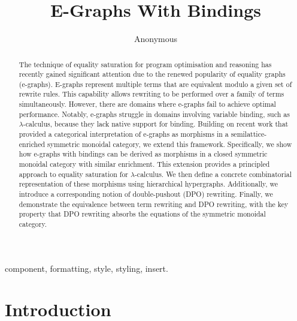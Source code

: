 \documentclass[]{IEEEtran}
\begin{document}
\title{E-Graphs With Bindings
}


\author{Anonymous}

\maketitle

\begin{abstract}
    The technique of equality saturation for program optimisation and reasoning has recently gained significant attention due to the renewed popularity of equality graphs (e-graphs).
    E-graphs represent multiple terms that are equivalent modulo a given set of rewrite rules. 
    This capability allows rewriting to be performed over a family of terms simultaneously.    
    However, there are domains where e-graphs fail to achieve optimal performance. 
	Notably, e-graphs struggle in domains involving variable binding, such as $\lambda$-calculus, because they lack native support for binding.
    Building on recent work that provided a categorical interpretation of e-graphs as morphisms in a semilattice-enriched symmetric monoidal category, we extend this framework. 
	Specifically, we show how e-graphs with bindings can be derived as morphisms in a closed symmetric monoidal category with similar enrichment. 
	This extension provides a principled approach to equality saturation for $\lambda$-calculus.
    We then define a concrete combinatorial representation of these morphisms using hierarchical hypergraphs. 
	Additionally, we introduce a corresponding notion of double-pushout (DPO) rewriting. 
	Finally, we demonstrate the equivalence between term rewriting and DPO rewriting, with the key property that DPO rewriting absorbs the equations of the symmetric monoidal category.
\end{abstract}

\begin{IEEEkeywords}
component, formatting, style, styling, insert.
\end{IEEEkeywords}

\section{Introduction}
\label{sec:introduction}
\end{document}
